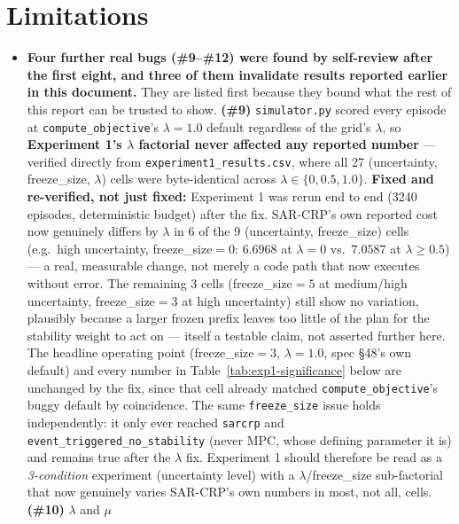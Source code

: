 \documentclass[11pt]{article}
\begin{document}
\section{Limitations}
\label{sec:limitations}

\begin{itemize}
  \item \textbf{Four further real bugs (\#9--\#12) were found by
    self-review after the first eight, and three of them invalidate results
    reported earlier in this document.} They are listed first because they
    bound what the rest of this report can be trusted to show.
    \textbf{(\#9)} \texttt{simulator.py} scored every episode at
    \texttt{compute\_objective}'s $\lambda=1.0$ default regardless of the
    grid's $\lambda$, so \textbf{Experiment 1's $\lambda$ factorial never
    affected any reported number} --- verified directly from
    \texttt{experiment1\_results.csv}, where all 27
    (uncertainty, freeze\_size, $\lambda$) cells were byte-identical across
    $\lambda \in \{0, 0.5, 1.0\}$. \textbf{Fixed and re-verified, not just
    fixed:} Experiment 1 was rerun end to end (3240 episodes, deterministic
    budget) after the fix. SAR-CRP's own reported cost now genuinely
    differs by $\lambda$ in 6 of the 9 (uncertainty, freeze\_size) cells
    (e.g.\ high uncertainty, freeze\_size$=0$: $6.6968$ at
    $\lambda{=}0$ vs.\ $7.0587$ at $\lambda{\geq}0.5$) --- a real,
    measurable change, not merely a code path that now executes without
    error. The remaining 3 cells (freeze\_size$=5$ at medium/high
    uncertainty, freeze\_size$=3$ at high uncertainty) still show no
    variation, plausibly because a larger frozen prefix leaves too little
    of the plan for the stability weight to act on --- itself a testable
    claim, not asserted further here. The headline operating point
    (freeze\_size$=3$, $\lambda{=}1.0$, spec \S48's own default) and every
    number in Table~\ref{tab:exp1-significance} below are unchanged by the
    fix, since that cell already matched \texttt{compute\_objective}'s
    buggy default by coincidence. The same \texttt{freeze\_size} issue
    holds independently: it only ever reached \texttt{sarcrp} and
    \texttt{event\_triggered\_no\_stability} (never MPC, whose defining
    parameter it is) and remains true after the $\lambda$ fix. Experiment 1
    should therefore be read as a \emph{3-condition} experiment
    (uncertainty level) with a $\lambda$/freeze\_size sub-factorial that
    now genuinely varies SAR-CRP's own numbers in most, not all, cells.
    \textbf{(\#10)} $\lambda$ and $\mu$

\end{itemize}
\end{document}
